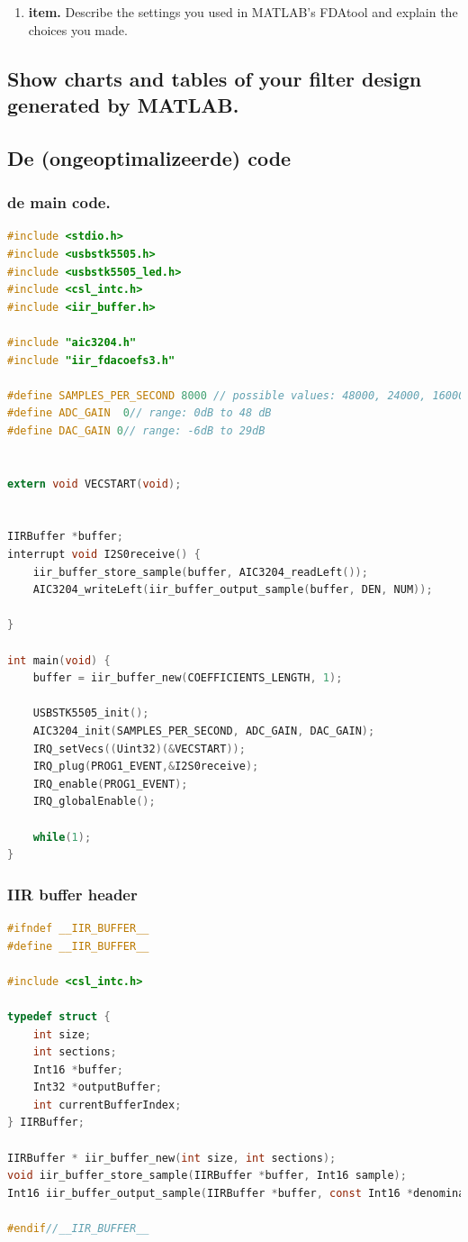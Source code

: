\documentclass[11pt,a4paper]{article}
\newcommand\litem[1]{\item{\bfseries#1.\space}}
\begin{document}
	\begin{enumerate}[label=\emph{\alph*)}]
		\litem{item} Describe the settings you 					used in MATLAB’s FDAtool and explain the 					choices you made.
	\end{enumerate}

	\subsection{Show charts and tables of your filter design generated by MATLAB.}
	\subsection{De (ongeoptimalizeerde) code}

	\subsubsection{de main code.}
	\begin{lstlisting}[language=c]
#include <stdio.h>
#include <usbstk5505.h>
#include <usbstk5505_led.h>
#include <csl_intc.h>
#include <iir_buffer.h>

#include "aic3204.h"
#include "iir_fdacoefs3.h"

#define SAMPLES_PER_SECOND 8000 // possible values: 48000, 24000, 16000, 12000, 9600, and 8000
#define ADC_GAIN  0// range: 0dB to 48 dB
#define DAC_GAIN 0// range: -6dB to 29dB


extern void VECSTART(void);


IIRBuffer *buffer;
interrupt void I2S0receive() {
	iir_buffer_store_sample(buffer, AIC3204_readLeft());
	AIC3204_writeLeft(iir_buffer_output_sample(buffer, DEN, NUM));

}

int main(void) {
	buffer = iir_buffer_new(COEFFICIENTS_LENGTH, 1);

	USBSTK5505_init();
	AIC3204_init(SAMPLES_PER_SECOND, ADC_GAIN, DAC_GAIN);
	IRQ_setVecs((Uint32)(&VECSTART));
	IRQ_plug(PROG1_EVENT,&I2S0receive);
	IRQ_enable(PROG1_EVENT);
	IRQ_globalEnable();

	while(1);
}
	\end{lstlisting}
	\clearpage
	
	\subsubsection{IIR buffer header}
	\begin{lstlisting}[language=c]
#ifndef __IIR_BUFFER__
#define __IIR_BUFFER__

#include <csl_intc.h>

typedef struct {
	int size;
	int sections;
	Int16 *buffer;
	Int32 *outputBuffer;
	int currentBufferIndex;
} IIRBuffer;

IIRBuffer * iir_buffer_new(int size, int sections);
void iir_buffer_store_sample(IIRBuffer *buffer, Int16 sample);
Int16 iir_buffer_output_sample(IIRBuffer *buffer, const Int16 *denominator, const Int16 *numerator);

#endif//__IIR_BUFFER__
		
	\end{lstlisting}
	\clearpage
	
\end{document}
